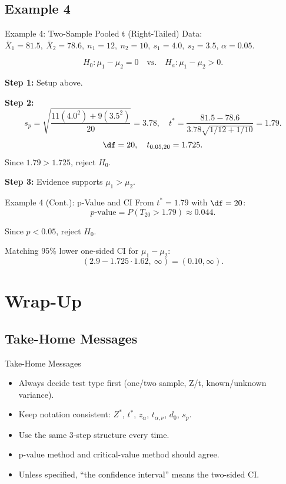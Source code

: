 \documentclass[aspectratio=169]{beamer}
\begin{document}
\subsection{Example 4}
\begin{frame}{Example 4: Two-Sample Pooled t (Right-Tailed)}
  Data: \(\bar X_1=81.5,\ \bar X_2=78.6,\ n_1=12,\ n_2=10,\ s_1=4.0,\ s_2=3.5\), \(\alpha=0.05\).

  \[
    H_0:\mu_1-\mu_2=0
    \quad\text{vs.}\quad
    H_a:\mu_1-\mu_2>0.
  \]

  \textbf{Step 1:} Setup above.

  \textbf{Step 2:}
  \[
    s_p=\sqrt{\frac{11(4.0^2)+9(3.5^2)}{20}}=3.78,
    \quad
    t^*=\frac{81.5-78.6}{3.78\sqrt{1/12+1/10}}=1.79.
  \]
  \[
    \df=20,
    \quad
    t_{0.05,20}=1.725.
  \]
  Since \(1.79>1.725\), reject \(H_0\).

  \textbf{Step 3:} Evidence supports \(\mu_1>\mu_2\).
\end{frame}

\begin{frame}{Example 4 (Cont.): p-Value and CI}
  From \(t^*=1.79\) with \(\df=20\):
  \[
    p\text{-value}=P(T_{20}>1.79)\approx0.044.
  \]

  Since \(p<0.05\), reject \(H_0\).

  Matching 95\% lower one-sided CI for \(\mu_1-\mu_2\):
  \[
    (2.9-1.725\cdot 1.62,\ \infty)=(0.10,\infty).
  \]
\end{frame}

\section{Wrap-Up}

\subsection{Take-Home Messages}
\begin{frame}{Take-Home Messages}
  \begin{itemize}
    \item Always decide test type first (one/two sample, Z/t, known/unknown variance).
    \item Keep notation consistent: \(Z^*\), \(t^*\), \(z_{\alpha}\), \(t_{\alpha,\nu}\), \(d_0\), \(s_p\).
    \item Use the same 3-step structure every time.
    \item p-value method and critical-value method should agree.
    \item Unless specified, ``the confidence interval'' means the two-sided CI.
  \end{itemize}
\end{frame}
\end{document}
